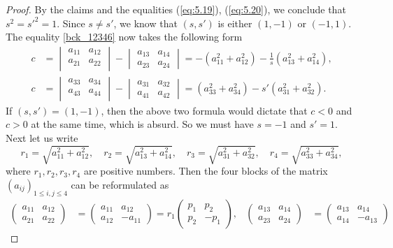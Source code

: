 \documentclass{amsart}
\numberwithin{equation}{section}
\theoremstyle{definition}
\renewcommand{\1}{\mathds{1}}
\renewcommand{\>}{\rightarrow}
\begin{document}
\begin{proof}
By the claims and the equalities (\ref{eq:5.19}), (\ref{eq:5.20}), we conclude that $s^2=s'^2=1$. Since $s\neq s'$, we know that $(s,s')$ is either $(1,-1)$ or $(-1,1)$. The equality \eqref{bck_12346} now takes the following form
\[\begin{split}
c &=\begin{vmatrix} a_{11} & a_{12} \\ a_{21} & a_{22} \\ \end{vmatrix} - \begin{vmatrix} a_{13} & a_{14} \\ a_{23} & a_{24} \end{vmatrix}
=-(a^2_{11}+a_{12}^2)-\frac{1}{s}(a^2_{13}+a^2_{14}), \\
c &= \begin{vmatrix} a_{33} & a_{34} \\ a_{43} & a_{44} \\ \end{vmatrix} - \begin{vmatrix} a_{31} & a_{32} \\ a_{41} & a_{42} \end{vmatrix}
=(a_{33}^2 + a_{34}^2) -s'(a_{31}^2+a_{32}^2).
\end{split}\]
If $(s,s')=(1,-1)$, then the above two formula would dictate that $c<0$ and $c>0$ at the same time, which is absurd. So we must have $s=-1$ and $s'=1$.
Next let us write
\[r_1 = \sqrt{a_{11}^2 + a_{12}^2},\quad r_2 = \sqrt{a_{13}^2+a_{14}^2},\quad r_3=\sqrt{a_{31}^2+a_{32}^2},\quad r_4=\sqrt{a_{33}^2+a_{34}^2},\]
where $r_1,r_2,r_3,r_4$ are positive numbers. Then the four blocks of the matrix $(a_{ij})_{1\leq i,j\leq 4}$ can be reformulated as
\begin{align*}
\begin{pmatrix} a_{11} & a_{12} \\ a_{21} & a_{22}\end{pmatrix} &= \begin{pmatrix} a_{11} & a_{12} \\ a_{12} & -a_{11} \end{pmatrix}
=r_1 \begin{pmatrix} p_1 & p_2 \\ p_2 & -p_1 \end{pmatrix}, &
\begin{pmatrix} a_{13} & a_{14} \\ a_{23} & a_{24} \end{pmatrix} &= \begin{pmatrix} a_{13} & a_{14} \\ a_{14} & -a_{13} \end{pmatrix}

\end{align*}
\end{proof}
\end{document}
